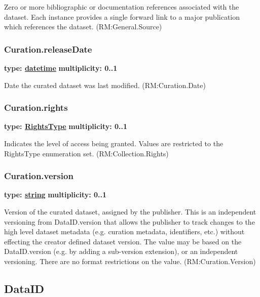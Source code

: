   Zero or more bibliographic or documentation references associated with the
  dataset. Each instance provides a single forward link to a major publication
  which references the dataset. (RM:General.Source)
  
  \subsubsection{Curation.releaseDate}
  \textbf{type: \hyperref[sect:dates]{datetime}} \newline
  \textbf{multiplicity: 0..1} \newline
  
  Date the curated dataset was last modified. (RM:Curation.Date)
  
  \subsubsection{Curation.rights}
  \textbf{type: \hyperref[sect:rights]{RightsType}} \newline
  \textbf{multiplicity: 0..1} \newline
  
  Indicates the level of access being granted. Values are restricted to the
  RightsType enumeration set. (RM:Collection.Rights)
  
  \subsubsection{Curation.version}
  \textbf{type: \hyperref[sect:ivoa]{string}} \newline
  \textbf{multiplicity: 0..1} \newline
  
  Version of the curated dataset, assigned by the publisher. This is an
  independent versioning from DataID.version that allows the publisher to track
  changes to the high level dataset metadata (e.g. curation metadata,
  identifiers, etc.) without effecting the creator defined dataset version. The
  value may be based on the DataID.version (e.g. by adding a sub-version extension),
  or an independent versioning. There are no format restrictions on the value. (RM:Curation.Version)  

  
\pagebreak
\subsection{DataID}
\label{sect:dataid}

